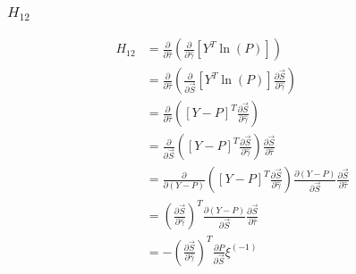\documentclass{article}
\begin{document}
\subsubsection{$H_{12}$}
\begin{equation}
\begin{aligned}
H_{12} &= \frac{\partial}{\partial \hat{\tau}}  \left( \frac{\partial}{\partial \hat{\gamma}}  \left[ Y^T \ln \left( P \right) \right] \right) 
\\
&= \frac{\partial}{\partial \hat{\tau}}  \left( \frac{\partial}{\partial \vec{S}}  \left[ Y^T \ln \left( P \right) \right] \frac{\partial \vec{S}}{\partial \hat{\gamma}} \right) 
\\
&= \frac{\partial}{\partial \hat{\tau}}  \left( \left[ Y - P \right]^T \frac{\partial \vec{S}}{\partial \hat{\gamma}} \right) 
\\
&= \frac{\partial}{\partial \vec{S}}  \left( \left[ Y - P \right]^T \frac{\partial \vec{S}}{\partial \hat{\gamma}} \right) \frac{\partial \vec{S}}{\partial \hat{\tau}} 
\\
&= \frac{\partial}{\partial \left( Y - P \right)}  \left( \left[ Y - P \right]^T \frac{\partial \vec{S}}{\partial \hat{\gamma}} \right) \frac{\partial \left( Y - P \right)}{\partial \vec{S}} \frac{\partial \vec{S}}{\partial \hat{\tau}} 
\\
&= \left( \frac{\partial \vec{S}}{\partial \hat{\gamma}} \right)^T \frac{\partial \left( Y - P \right)}{\partial \vec{S}} \frac{\partial \vec{S}}{\partial \hat{\tau}} 
\\
&= - \left( \frac{\partial \vec{S}}{\partial \hat{\gamma}} \right)^T \frac{\partial P}{\partial \vec{S}} \xi^{(-1)}
\end{aligned}
\end{equation}
\end{document}
